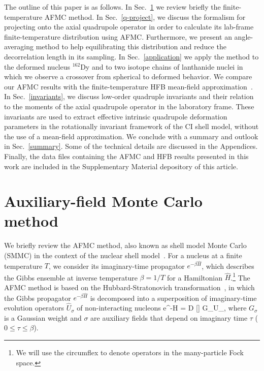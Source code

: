\documentclass[prc,twocolumn,aps,showpacs,floatfix,nofootinbib,letterpaper,preprintnumbers]{revtex4-1}
\begin{document}
The outline of this paper is as follows. In Sec.~\ref{AFMC} we review briefly the finite-temperature AFMC method. In Sec.~\ref{q-project}, we discuss the formalism for projecting onto the axial quadrupole operator in order to calculate its lab-frame finite-temperature distribution using AFMC. Furthermore, we present an angle-averaging method to help equilibrating this distribution and reduce the decorrelation length in its sampling. In Sec.~\ref{application} we apply the method to the deformed nucleus $^{162}$Dy and to two isotope chains of lanthanide nuclei in which we observe a crossover from spherical to deformed behavior. We compare our AFMC results with the finite-temperature HFB mean-field approximation~\cite{go81,ta81}. In Sec.~\ref{invariants}, we discuss low-order quadruple invariants and their relation to the moments of the axial quadrupole operator in the laboratory frame. These invariants are used to extract effective intrinsic quadrupole deformation parameters in the rotationally invariant framework of the CI shell model, without the use of a mean-field approximation. We conclude with a summary and outlook in Sec.~\ref{summary}. Some of the technical details are discussed in the Appendices. Finally, the data files containing the AFMC and HFB results presented in this work are included in the Supplementary Material depository of this article.

\section{Auxiliary-field Monte Carlo method}\label{AFMC}

We briefly review the AFMC method, also known as shell model Monte Carlo (SMMC) in the context of the nuclear shell model~\cite{la93,al94,al17}. For a nucleus at a finite temperature $T$, we consider its imaginary-time propagator $e^{-\beta \hat H}$, which describes the Gibbs ensemble at inverse temperature $\beta = 1/T$ for a
Hamiltonian $\hat H$.\footnote{We will use the circumflex
to denote operators in the many-particle Fock space.}
The AFMC method is based on the Hubbard-Stratonovich
transformation~\cite{HS}, in which the Gibbs propagator $e^{-\beta \hat H}$ is decomposed into a
superposition of imaginary-time evolution operators $\hat U_\sigma$  of non-interacting nucleons
\be
  e^{-\beta \hat H} = \int \mathcal D [\sigma] \; G_\sigma  \hat U_\sigma \;,
\ee
where $G_\sigma$ is a Gaussian weight and $\sigma$ are auxiliary fields that depend on imaginary time $\tau$ ($0 \le \tau\le \beta$).
\end{document}
